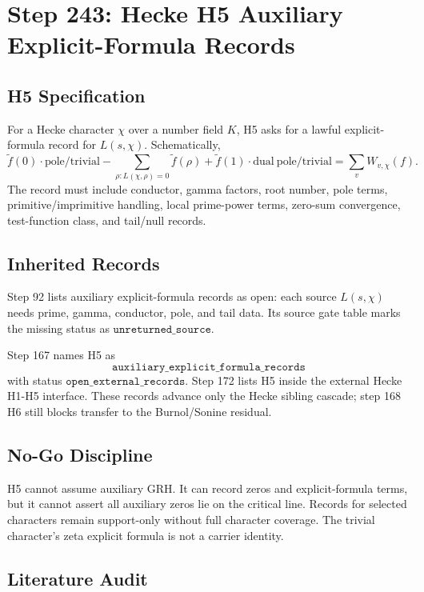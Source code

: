 \section*{Step 243: Hecke H5 Auxiliary Explicit-Formula Records}

\subsection*{H5 Specification}

For a Hecke character \(\chi\) over a number field \(K\), H5 asks for a
lawful explicit-formula record for \(L(s,\chi)\). Schematically,
\[
\widetilde f(0)\cdot \mathrm{pole/trivial}
  - \sum_{\rho:L(\chi,\rho)=0}\widetilde f(\rho)
  + \widetilde f(1)\cdot \mathrm{dual\ pole/trivial}
  = \sum_v W_{v,\chi}(f).
\]
The record must include conductor, gamma factors, root number, pole terms,
primitive/imprimitive handling, local prime-power terms, zero-sum convergence,
test-function class, and tail/null records.

\subsection*{Inherited Records}

Step 92 lists auxiliary explicit-formula records as open: each source
\(L(s,\chi)\) needs prime, gamma, conductor, pole, and tail data. Its source
gate table marks the missing status as \(\texttt{unreturned\_source}\).

Step 167 names H5 as
\[
\texttt{auxiliary\_explicit\_formula\_records}
\]
with status \(\texttt{open\_external\_records}\). Step 172 lists H5 inside
the external Hecke H1-H5 interface. These records advance only the Hecke
sibling cascade; step 168 H6 still blocks transfer to the Burnol/Sonine
residual.

\subsection*{No-Go Discipline}

H5 cannot assume auxiliary GRH. It can record zeros and explicit-formula
terms, but it cannot assert all auxiliary zeros lie on the critical line.
Records for selected characters remain support-only without full character
coverage. The trivial character's zeta explicit formula is not a carrier
identity.

\subsection*{Literature Audit}

